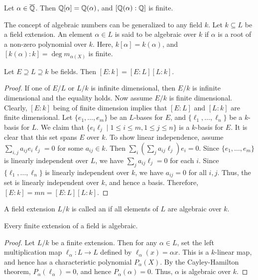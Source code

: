 \begin{lemma}
    Let $\alpha \in \overline{\mathbb{Q}}$. Then $\mathbb{Q}[\alpha] = \mathbb{Q}(\alpha)$, and $[\mathbb{Q}(\alpha):\mathbb{Q}]$ is finite.
\end{lemma}

The concept of algebraic numbers can be generalized to any field $k$. Let $k \subseteq L$ be a field extension. An element $\alpha \in L$ is said to be algebraic over $k$ if $\alpha$ is a root of a non-zero polynomial over $k$. Here, $k[\alpha] = k(\alpha)$, and $[k(\alpha):k] = \deg m_{\alpha(X)}$ is finite.

\begin{lemma}
    Let $E \supseteq L \supseteq k$ be fields. Then $[E:k] = [E:L][L:k]$.
\end{lemma}

\begin{proof}
    If one of $E/L$ or $L/k$ is infinite dimensional, then $E/k$ is infinite dimensional and the equality holds. Now assume $E/k$ is finite dimensional. Clearly, $[E:k]$ being of finite dimension implies that $[E:L]$ and $[L:k]$ are finite dimensional. Let $\{e_{1},\ldots,e_{m}\}$ be an $L$-bases for $E$, and $\{\ell_{1},\ldots,\ell_{n}\}$ be a $k$-basis for $L$. We claim that $\{e_{i}\ell_{j} \mid 1 \leq i \leq m, 1 \leq j \leq n\}$ is a $k$-basis for $E$. It is clear that this set spans $E$ over $k$. To show linear independence, assume $\sum_{i,j} a_{ij} e_{i}\ell_{j} = 0$ for some $a_{ij} \in k$. Then $\sum_{i} (\sum_{j} a_{ij}\ell_{j}) e_{i} = 0$. Since $\{e_{1},\ldots,e_{m}\}$ is linearly independent over $L$, we have $\sum_{j} a_{ij}\ell_{j} = 0$ for each $i$. Since $\{\ell_{1},\ldots,\ell_{n}\}$ is linearly independent over $k$, we have $a_{ij} = 0$ for all $i,j$. Thus, the set is linearly independent over $k$, and hence a basis. Therefore, $[E:k] = mn = [E:L][L:k]$.
\end{proof}

\begin{definition}
    A field extension $L/k$ is called an  if all elements of $L$ are algebraic over $k$. 
\end{definition}

\begin{theorem}
    Every finite extension of a field is algebraic.
\end{theorem}
\begin{proof}
    Let $L/k$ be a finite extension. Then for any $\alpha \in L$, set the left multiplication map $\ell_{\alpha} : L \to L$ defined by $\ell_{\alpha}(x) = \alpha x$. This is a $k$-linear map, and hence has a characteristic polynomial $P_{\alpha}(X)$. By the Cayley-Hamilton theorem, $P_{\alpha}(\ell_{\alpha}) = 0$, and hence $P_{\alpha}(\alpha) = 0$. Thus, $\alpha$ is algebraic over $k$.
\end{proof}

